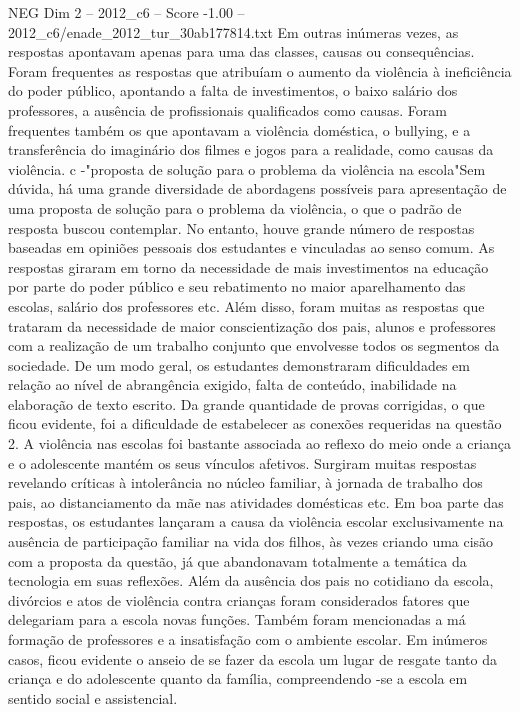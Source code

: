 \begin{textsample}{NEG Dim 2 – 2012\_c6 – Score -1.00 – 2012\_c6/enade\_2012\_tur\_30ab177814.txt}
Em outras inúmeras vezes, as respostas apontavam apenas para uma das classes, causas ou consequências.
Foram frequentes as respostas que atribuíam o aumento da violência à ineficiência do poder público, apontando a falta de investimentos, o baixo salário dos professores, a ausência de profissionais qualificados como causas.
Foram frequentes também os que apontavam a violência doméstica, o bullying, e a transferência do imaginário dos filmes e jogos para a realidade, como causas da violência. c -"proposta de solução para o problema da violência na escola"Sem dúvida, há uma grande diversidade de abordagens possíveis para apresentação de uma proposta de solução para o problema da violência, o que o padrão de resposta buscou contemplar.
No entanto, houve grande número de respostas baseadas em opiniões pessoais dos estudantes e vinculadas ao senso comum.
As respostas giraram em torno da necessidade de mais investimentos na educação por parte do poder público e seu rebatimento no maior aparelhamento das escolas, salário dos professores etc.
Além disso, foram muitas as respostas que trataram da necessidade de maior conscientização dos pais, alunos e professores com a realização de um trabalho conjunto que envolvesse todos os segmentos da sociedade.
De um modo geral, os estudantes demonstraram dificuldades em relação ao nível de abrangência exigido, falta de conteúdo, inabilidade na elaboração de texto escrito.
Da grande quantidade de provas corrigidas, o que ficou evidente, foi a dificuldade de estabelecer as conexões requeridas na questão 2.
A violência nas escolas foi bastante associada ao reflexo do meio onde a criança e o adolescente mantém os seus vínculos afetivos.
Surgiram muitas respostas revelando críticas à intolerância no núcleo familiar, à jornada de trabalho dos pais, ao distanciamento da mãe nas atividades domésticas etc.
Em boa parte das respostas, os estudantes lançaram a causa da violência escolar exclusivamente na ausência de participação familiar na vida dos filhos, às vezes criando uma cisão com a proposta da questão, já que abandonavam totalmente a temática da tecnologia em suas reflexões.
Além da ausência dos pais no cotidiano da escola, divórcios e atos de violência contra crianças foram considerados fatores que delegariam para a escola novas funções.
Também foram mencionadas a má formação de professores e a insatisfação com o ambiente escolar.
Em inúmeros casos, ficou evidente o anseio de se fazer da escola um lugar de resgate tanto da criança e do adolescente quanto da família, compreendendo -se a escola em sentido social e assistencial.

\end{textsample}
